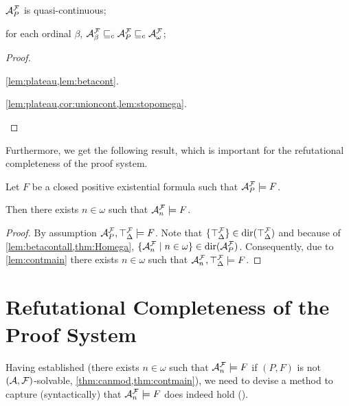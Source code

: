 \documentclass[a4paper,twoside,notitlepage,openright,11pt]{report}
\begin{document}
\begin{theorem}
\begin{thmlist}
\item $\mathcal A^\mathcal F_P$ is quasi-continuous;
\item\label{thm:Homega} for each ordinal $\beta$, $\mathcal A^\mathcal F_\beta\sqsubseteq_c\mathcal A^\mathcal F_P\sqsubseteq_c\mathcal A^\mathcal F_\omega$;
\end{thmlist}
\end{theorem}
\begin{proof}
  \begin{thmlist}
  \item \cref{lem:plateau,lem:betacont}.
  \item \cref{lem:plateau,cor:unioncont,lem:stopomega}.\qedhere
  \end{thmlist}
\end{proof}
Furthermore, we get the following result, which is important for the refutational completeness of the proof system.
\begin{theorem}
  \label{thm:contmain}
  Let $F$ be a closed positive existential formula such that $\mathcal A^\mathcal F_P\models F$.

  Then there exists $n\in\omega$ such that $\mathcal A^\mathcal F_n\models F$.
\end{theorem}
\begin{proof}
  By assumption $\mathcal A^\mathcal F_P,\top^\mathcal F_\Delta\models F$. Note that $\{\top^\mathcal F_\Delta\}\in\operatorname{dir}(\top^\mathcal F_\Delta)$ and because of \cref{lem:betacontall,thm:Homega}, $\{\mathcal A^\mathcal F_n\mid n\in\omega\}\in\operatorname{dir}(\mathcal A^\mathcal F_P)$.
  Consequently, due to \cref{lem:contmain} there exists $n\in\omega$ such that $\mathcal A^\mathcal F_n,\top^\mathcal F_\Delta\models F$.
\end{proof}

\section{Refutational Completeness of the Proof System}
\label{sec:completeness}
\label{SEC:COMPLETENESS}
Having established  (there exists $n\in\omega$ such that $\mathcal A_n^\mathcal F\models F$ if $(P,F)$ is not $(\mathcal A,\mathcal F)$-solvable, \cref{thm:canmod,thm:contmain}), we need to devise a method to capture (syntactically) that $\mathcal A^\mathcal F_n\models F$ does indeed hold ().
\end{document}
